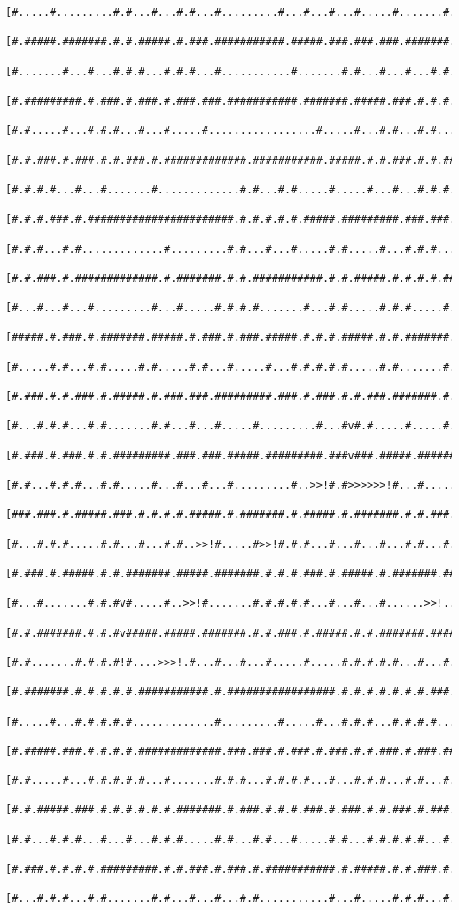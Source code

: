 \documentclass[a4paper,10pt,ngerman]{scrartcl}
\begin{document}
\begin{lstlisting}[frame=tb]
 [#.....#.........#.#...#...#.#...#.........#...#...#...#.....#.......#.........#.#]
 [#.#####.#######.#.#.#####.#.###.###########.#####.###.###.###.#######.#####.###.#]
 [#.......#...#...#.#.#...#.#.#...#...........#.......#.#...#...#...#.#.#...#.#...#]
 [#.#########.#.###.#.###.#.###.###.###########.#######.#####.###.#.#.#.#.#.###.#.#]
 [#.#.....#...#.#.#...#...#.....#.................#.....#...#.#...#.#...#.#.....#.#]
 [#.#.###.#.###.#.#.###.#.#############.###########.#####.#.#.###.#.#.###.#######.#]
 [#.#.#.#...#...#.......#.............#.#...#.#.....#.....#...#...#.#.#...#.....#.#]
 [#.#.#.###.#.#######################.#.#.#.#.#.#####.#########.###.###.###.#.###.#]
 [#.#.#...#.#.............#.........#.#...#...#.....#.#.....#...#.#.#...#.#.#.....#]
 [#.#.###.#.#############.#.#######.#.#.###########.#.#.#####.#.#.#.#.###.#.#######]
 [#...#...#...#.........#...#.....#.#.#.#.......#...#.#.....#.#.#.....#...#...#...#]
 [#####.#.###.#.#######.#####.#.###.#.###.#####.#.#.#.#####.#.#.#######.#####.#.#.#]
 [#.....#.#...#.#.....#.#.....#.#...#.....#...#.#.#.#.#.....#.#.......#.........#.#]
 [#.###.#.#.###.#.#####.#.###.###.#########.###.#.###.#.#.###.#######.#.###########]
 [#...#.#.#...#.#.......#.#...#...#.....#.........#...#v#.#.....#.....#...#.......#]
 [#.###.#.###.#.#.#########.###.###.#####.#########.###v###.#####.#########.#####.#]
 [#.#...#.#.#...#.#.....#...#...#...#.........#..>>!#.#>>>>>>!#...#.....#...#.....#]
 [###.###.#.#####.###.#.#.#.#.#####.#.#######.#.#####.#.#######.#.#.###.#.###.###.#]
 [#...#.#.#.....#.#...#...#.#..>>!#.....#>>!#.#.#...#...#...#...#.#...#...#...#...#]
 [#.###.#.#####.#.#.#######.#####.#######.#.#.#.###.#.#####.#.#######.#####.###.###]
 [#...#.......#.#.#v#.....#..>>!#.......#.#.#.#.#...#...#...#......>>!..#...#.#...#]
 [#.#.#######.#.#.#v#####.#####.#######.#.#.###.#.#####.#.#.#######.#####.###.###.#]
 [#.#.......#.#.#.#!#....>>>!.#...#...#...#.....#.....#.#.#.#.#...#...#...#.#.....#]
 [#.#######.#.#.#.#.#.###########.#.#################.#.#.#.#.#.#.#.###.###.#.#####]
 [#.....#...#.#.#.#.#.............#.........#.....#...#.#.#...#.#.#.#...#...#...#.#]
 [#.#####.###.#.#.#.#.#############.###.###.#.###.#.###.#.#.###.#.###.###.#####.#.#]
 [#.#.....#...#.#.#.#.#...#.......#.#.#...#.#.#.#...#...#.#.#...#.#...#.#.....#...#]
 [#.#.#####.###.#.#.#.#.#.#.#######.#.###.#.#.#.###.#.###.#.#.###.#.###.#.###.###.#]
 [#.#...#.#.#...#...#...#.#.#.....#.#...#.#...#.....#.#...#.#.#.#.#...#...#.....#.#]
 [#.###.#.#.#.#.#########.#.#.###.#.###.#.###########.#.#####.#.#.###.#.###.#.###.#]
 [#...#.#.#...#.#.......#.#...#...#...#.#...........#...#.....#.#.#...#.#...#.#...#]

\end{lstlisting}
\end{document}
